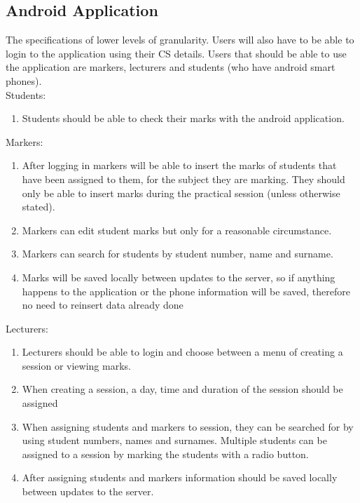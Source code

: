 \documentclass[12pt,a4paper]{article}
\begin{document}
\subsection{Android Application}
The specifications of lower levels of granularity. 
Users will also have to be able to login to the application using their CS details. Users that should be able to use the application are markers, lecturers and students (who have android smart phones).\\

Students: 
\begin{enumerate}
\item  Students should be able to check their marks with the android application. 
\end{enumerate}



Markers: 

\begin{enumerate}
\item  After logging in markers will be able to insert the marks of students that have been assigned to them, for the subject they are marking. They should only be able to insert marks during the practical session (unless otherwise stated). 

\item  Markers can edit student marks but only for a reasonable circumstance. 

\item  Markers can search for students by student number, name and surname.

\item  Marks will be saved locally between updates to the server, so if anything happens to the application or the phone information will be saved, therefore no need to reinsert data already done
\end{enumerate}

 

Lecturers: 

\begin{enumerate}
\item  Lecturers should be able to login and choose between a menu of creating a session or viewing marks.

\item  When creating a session, a day, time and duration of the session should be assigned

\item  When assigning students and markers to session, they can be searched for by using student numbers, names and surnames. Multiple students can be assigned to a session by marking the students with a radio button.

\item  After assigning students and markers information should be saved locally between updates to the server.
\end{enumerate}
\end{document}
